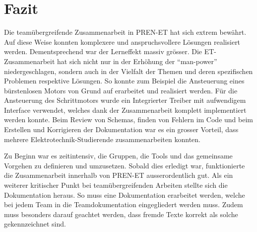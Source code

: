 \ifSTANDALONE
\section{Fazit}
\fi
    Die teamübergreifende Zusammenarbeit in PREN-ET hat sich extrem bewährt. 
    Auf diese Weise konnten komplexere und anspruchsvollere Lösungen 
    realisiert werden. Dementsprechend war der Lerneffekt massiv grösser. Die 
    ET-Zusammenarbeit hat sich nicht nur in der Erhöhung der 
    \enquote{man-power} niedergeschlagen, sondern auch in der Vielfalt der 
    Themen und deren spezifischen Problemen respektive Lösungen. So konnte zum 
    Beispiel die Ansteuerung eines bürstenlosen Motors von Grund auf 
    erarbeitet und realisiert werden. Für die Ansteuerung des Schrittmotors 
    wurde ein Integrierter Treiber mit aufwendigem Interface verwendet, 
    welches dank der Zusammenarbeit komplett implementiert werden konnte. Beim 
    Review von Schemas, finden von Fehlern im Code und beim Erstellen und 
    Korrigieren der Dokumentation war es ein grosser Vorteil, dass mehrere 
    Elektrotechnik-Studierende zusammenarbeiten konnten.\ifSTANDALONE
    
    \noindent
    \fi
    Zu Beginn war es zeitintensiv, die Gruppen, die Tools und das gemeinsame 
    Vorgehen zu definieren und umzusetzen. Sobald dies erledigt war, 
    funktionierte die Zusammenarbeit innerhalb von PREN-ET ausserordentlich 
    gut. Als ein weiterer kritischer Punkt bei teamübergreifenden Arbeiten 
    stellte sich die Dokumentation heraus. So muss eine Dokumentation 
    erarbeitet werden, welche bei jedem Team in die Teamdokumentation 
    eingegliedert werden muss. Zudem muss besonders darauf geachtet werden, 
    dass fremde Texte korrekt als solche gekennzeichnet sind. 
